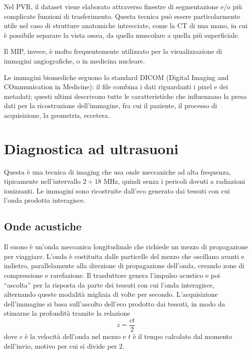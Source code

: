 \documentclass[11pt, a4paper]{scrartcl}
\theoremstyle{style}
\theoremstyle{style1}
\numberwithin{equation}{subsection}
\begin{document}
Nel PVR, il dataset viene elaborato attraverso finestre di segmentazione e/o pi\`u complicate funzioni di trasferimento.
Questa tecnica pu\`o essere particolarmente utile nel caso di strutture anatomiche intrecciate, come la CT di una mano, in cui \`e possibile separare la vista ossea, da quella muscolare a quella pi\`u superficiale.

Il MIP, invece, \`e molto frequentemente utilizzato per la visualizzazione di immagini angiografiche, o in medicina nucleare.

Le immagini biomediche seguono lo standard DICOM (Digital Imaging and COmmunication in Medicine): il file combina i dati riguardanti i pixel e dei metadati; questi ultimi descrivono tutte le caratteristiche che influenzano la presa dati per la ricostruzione dell'immagine, fra cui il paziente, il processo di acquisizione, la geometria, eccetera.






\newpage

\section{Diagnostica ad ultrasuoni}

Questa \`e una tecnica di imaging che usa onde meccaniche ad alta frequenza, tipicamente nell'intervallo $2\div 18 $ MHz, quindi senza i pericoli dovuti a radiazioni ionizzanti.
Le immagini sono ricostruite dall'eco generato dai tessuti con cui l'onda prodotta interagisce.

\subsection{Onde acustiche}

Il suono \`e un'onda meccanica longitudinale che richiede un mezzo di propagazione per viaggiare.
L'onda \`e costituita dalle particelle del mezzo che oscillano avanti e indietro, parallelamente alla direzione di propagazione dell'onda, creando zone di compressione e rarefazione.
Il trasduttore genera l'impulso acustico e poi ``ascolta'' per la risposta da parte dei tessuti con cui l'onda interagisce, alternando queste modalit\`a migliaia di volte per secondo.
L'acquisizione dell'immagine si basa sull'ascolto dell'eco prodotto dai tessuti, in modo da stimarne la profondit\`a tramite la relazione
\begin{equation}
	z = \frac{ct}{2}
\end{equation}
dove $c$ \`e la velocit\`a dell'onda nel mezzo e $t$ \`e il tempo calcolato dal momento dell'invio, motivo per cui si divide per $2$.
\end{document}
